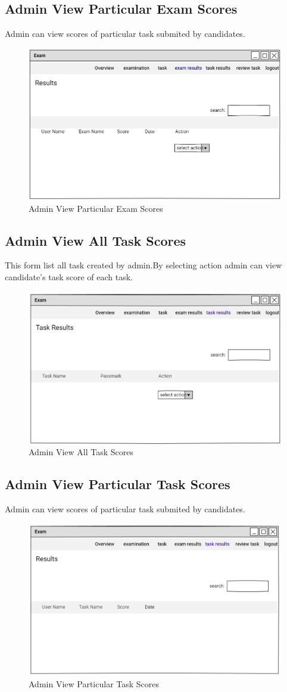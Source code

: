 \documentclass[a4paper,12pt]{report}
\begin{document}
\subsection { Admin View Particular Exam Scores}
Admin can view scores of particular task submited by candidates. 
\begin{figure}[bph]
	\centering
	\includegraphics[width=.6\linewidth]{img/admin/adminviewrsltofparticlrxam}
	\caption{Admin View Particular Exam Scores}
\end{figure}
\pagebreak
\subsection { Admin View All Task Scores}
This form list all task created by admin.By selecting action admin can view candidate's  task score of each task. 
\begin{figure}[bph]
	\centering
	\includegraphics[width=.6\linewidth]{img/admin/adviewalltskrslt}
	\caption{Admin View All Task Scores}
\end{figure}
\pagebreak
\subsection { Admin View Particular Task Scores}
Admin can view scores of particular task submited by candidates. 
\begin{figure}[bph]
	\centering
	\includegraphics[width=.6\linewidth]{img/admin/adview_singletskrslt}
	\caption{Admin View Particular Task Scores}
\end{figure}
\pagebreak
\end{document}
